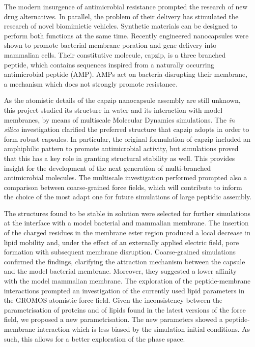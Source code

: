 \begin{onehalfspacing}

\noindent
%
The modern insurgence of antimicrobial resistance prompted the research of new drug alternatives. In parallel, the problem of their delivery has stimulated the research of novel biomimietic vehicles.
%
Synthetic materials can be designed to perform both functions at the same time. Recently engineered nanocapsules were shown to promote bacterial membrane poration and gene delivery into mammalian cells. Their constitutive molecule, capzip, is a three branched peptide, which contains sequences inspired from a naturally occurring antimicrobial peptide (AMP). AMPs act on bacteria disrupting their membrane, a mechanism which does not strongly promote resistance.

As the atomistic details of the capzip nanocapsule assembly are still unknown, this project studied its structure in water and its interaction with model membranes, by means of multiscale Molecular Dynamics simulations. 
%
The \emph{in silico} investigation clarified the preferred structure that capzip adopts in order to form robust capsules.
In particular, the original formulation of capzip included an amphiphilic pattern to promote antimicrobial activity, but simulations proved that this has a key role in granting structural stability as well. This provides insight for the development of the next generation of multi-branched antimicrobial molecules.
%
The multiscale investigation performed prompted also a comparison between coarse-grained force fields, which will contribute to inform the choice of the most adapt one for future simulations of large peptidic assembly.

The structures found to be stable in solution were selected for further simulations at the interface with a model bacterial and mammalian membrane.
%
The insertion of the charged residues in the membrane ester region produced a local decrease in lipid mobility and, under the effect of an externally applied electric field, pore formation with subsequent membrane disruption.
%
Coarse-grained simulations confirmed the findings, clarifying the attraction mechanism between the capsule and the model bacterial membrane. Moreover, they suggested a lower affinity with the model mammalian membrane.
%
The exploration of the peptide-membrane interactions prompted an investigation of the currently used lipid parameters in the GROMOS atomistic force field. Given the inconsistency between the parametrisation of proteins and of lipids found in the latest versions of the force field, we proposed a new parametrisation. The new parameters showed a peptide-membrane interaction which is less biased by the simulation initial conditions. As such, this allows for a better exploration of the phase space.

\end{onehalfspacing}


